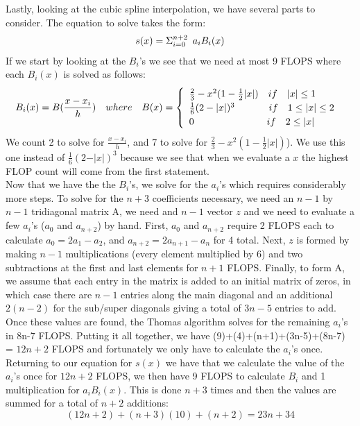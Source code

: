 \documentclass[11pt,a4paper]{article}
\begin{document}
\begin{itemize}
\begin{enumerate} [label={\alph*)}]
					Lastly, looking at the cubic spline interpolation, we have several parts to consider. The equation to solve takes the form:
					$$s(x) = \Sigma_{i=0}^{n+2}\mkern9mu a_iB_i(x)$$
					If we start by looking at the $B_i$'s we see that we need at most 9 FLOPS where each $B_i(x)$ is solved as follows:
					$$B_i(x) = B(\frac{x-x_i}{h}) \quad where \quad B(x) = \begin{cases}
					\mkern9mu \frac{2}{3} - x^2(1-\frac{1}{2}\vert x \vert)\quad if \quad \vert x \vert \leq 1 \\
					\mkern9mu \frac{1}{6}(2-\vert x \vert)^3 \quad \quad \quad \mkern9mu  if \quad 1 \leq \vert x \vert \leq 2 \\
					\mkern9mu 0 \quad \quad \quad \quad \quad \quad \quad \mkern9mu  if \quad 2 \leq \vert x \vert
					\end{cases}$$
					We count 2 to solve for $\frac{x-x_i}{h}$, and 7 to solve for $\frac{2}{3} - x^2(1-\frac{1}{2}\vert x \vert)$). We use this one instead of $\frac{1}{6}(2-\vert x \vert)^3$ because we see that when we evaluate a $x$ the highest FLOP count will come from the first statement.\\
					Now that we have the the $B_i$'s, we solve for the $a_i$'s which requires considerably more steps. To solve for the $n+3$ coefficients necessary, we need an $n-1$ by $n-1$ tridiagonal matrix A, we need and $n-1$ vector $z$ and we need to evaluate a few $a_i$'s ($a_0$ and $a_{n+2}$) by hand. First, $a_0$ and $a_{n+2}$ require 2 FLOPS each to calculate $a_0 = 2a_1-a_2$, and $a_{n+2} = 2a_{n+1}-a_{n}$ for 4 total. Next, $z$ is formed by making $n-1$ multiplications (every element multiplied by 6) and two subtractions at the first and last elements for $n+1$ FLOPS. Finally, to form A, we assume that each entry in the matrix is added to an initial matrix of zeros, in which case there are $n-1$ entries along the main diagonal and an additional $2(n-2)$ for the sub/super diagonals giving a total of $3n-5$ entries to add.\\
					
					Once these values are found, the Thomas algorithm solves for the remaining $a_i$'s in 8n-7 FLOPS. Putting it all together, we have (9)+(4)+(n+1)+(3n-5)+(8n-7) = $12n+2$ FLOPS and fortunately we only have to calculate the $a_i$'s once. Returning to our equation for $s(x)$ we have that we calculate the value of the $a_i$'s once for $12n+2$ FLOPS, we then have 9 FLOPS to calculate $B_i$ and 1 multiplication for $a_iB_i(x)$. This is done $n+3$ times and then the values are summed for a total of $n+2$ additions:
					$$(12n+2)+(n+3)(10)+(n+2) = 23n+34$$
					

\end{enumerate}
\end{itemize}
\end{document}
